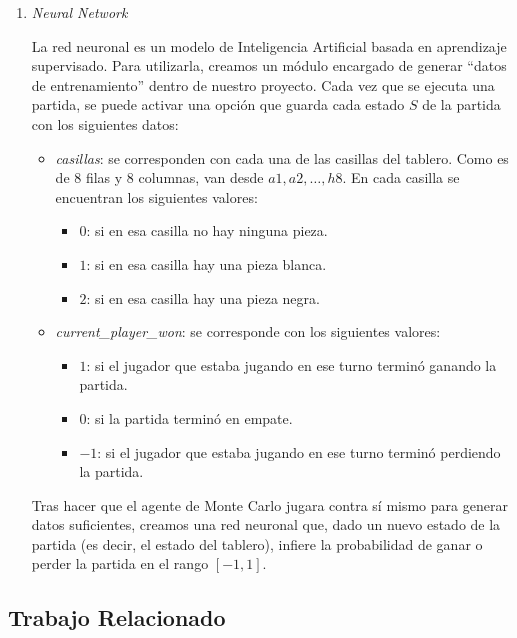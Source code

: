 \documentclass[conference,a4paper]{IEEEtran}
\begin{document}
\begin{enumerate}
  \item \textit{Neural Network}
  
  La red neuronal es un modelo de Inteligencia Artificial basada en aprendizaje supervisado. Para utilizarla,
  creamos un módulo encargado de generar ``datos de entrenamiento'' dentro de nuestro proyecto. Cada vez que
  se ejecuta una partida, se puede activar una opción que guarda cada estado $S$ de la partida con los
  siguientes datos:

  \begin{itemize}
    \item \textit{casillas}: se corresponden con cada una de las casillas del tablero. Como es de 8 filas
    y 8 columnas, van desde $a1,a2, \dots,h8$. En cada casilla se encuentran los siguientes valores:

    \begin{itemize}
      \item $0$: si en esa casilla no hay ninguna pieza.
      \item $1$: si en esa casilla hay una pieza blanca.
      \item $2$: si en esa casilla hay una pieza negra.
    \end{itemize}

    \item \textit{current\_player\_won}: se corresponde con los siguientes valores:
    
    \begin{itemize}
      \item $1$: si el jugador que estaba jugando en ese turno terminó ganando la partida.
      \item $0$: si la partida terminó en empate.
      \item $-1$: si el jugador que estaba jugando en ese turno terminó perdiendo la partida.
    \end{itemize}

  \end{itemize}

  Tras hacer que el agente de Monte Carlo jugara contra sí mismo para generar datos suficientes, creamos
  una red neuronal que, dado un nuevo estado de la partida (es decir, el estado del tablero), infiere la
  probabilidad de ganar o perder la partida en el rango $[-1,1]$.

\end{enumerate}

\subsection{Trabajo Relacionado}
\end{document}
